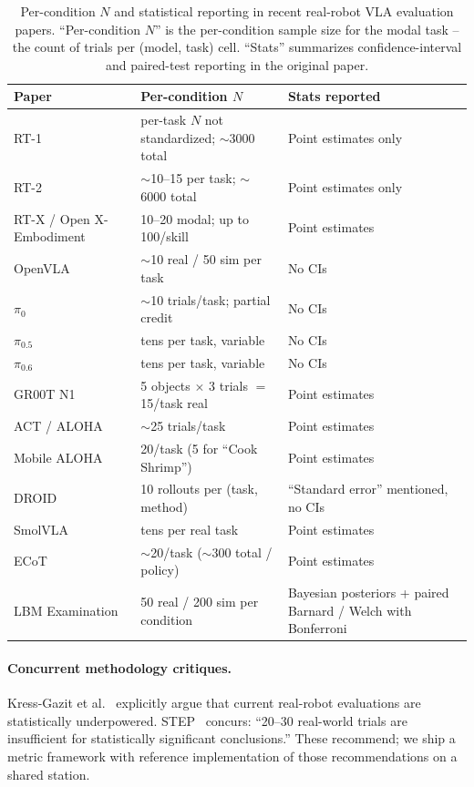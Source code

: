 \documentclass{article}
\begin{document}
\begin{table}[!h]
\centering
\small
\begin{tabular}{p{4.6cm}p{6cm}p{4cm}}
\toprule
Paper & Per-condition $N$ & Stats reported \\
\midrule
RT-1~\cite{rt1} & per-task $N$ not standardized; $\sim$3000 total & Point estimates only \\
RT-2~\cite{rt2} & $\sim$10--15 per task; $\sim$6000 total & Point estimates only \\
RT-X / Open X-Embodiment~\cite{rtx} & 10--20 modal; up to 100/skill & Point estimates \\
OpenVLA~\cite{openvla} & $\sim$10 real / 50 sim per task & No CIs \\
$\pi_{0}$~\cite{pi0} & $\sim$10 trials/task; partial credit & No CIs \\
$\pi_{0.5}$~\cite{pi05} & tens per task, variable & No CIs \\
$\pi_{0.6}$~\cite{pi06} & tens per task, variable & No CIs \\
GR00T N1~\cite{groot_n1} & 5 objects $\times$ 3 trials $=$ 15/task real & Point estimates \\
ACT / ALOHA~\cite{act} & $\sim$25 trials/task & Point estimates \\
Mobile ALOHA~\cite{mobilealoha} & 20/task (5 for ``Cook Shrimp'') & Point estimates \\
DROID~\cite{droid} & 10 rollouts per (task, method) & ``Standard error'' mentioned, no CIs \\
SmolVLA~\cite{smolvla} & tens per real task & Point estimates \\
ECoT~\cite{ecot} & $\sim$20/task ($\sim$300 total / policy) & Point estimates \\
\midrule
LBM Examination~\cite{lbm2026} & 50 real / 200 sim per condition & Bayesian posteriors + paired Barnard / Welch with Bonferroni \\
\bottomrule
\end{tabular}
\normalsize
\caption{Per-condition $N$ and statistical reporting in recent real-robot VLA evaluation papers. ``Per-condition $N$'' is the per-condition sample size for the modal task -- the count of trials per (model, task) cell. ``Stats'' summarizes confidence-interval and paired-test reporting in the original paper.}
\label{tab:survey}
\end{table}

\paragraph{Concurrent methodology critiques.} Kress-Gazit et al.~\cite{kress2024} explicitly argue that current real-robot evaluations are statistically underpowered. STEP~\cite{snyder2025} concurs: ``20--30 real-world trials are insufficient for statistically significant conclusions.'' These recommend; we ship a metric framework with reference implementation of those recommendations on a shared station.
\end{document}
